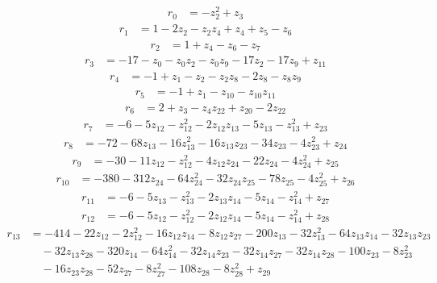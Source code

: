 \begingroup\small
\setlength{\jot}{2pt}
\allowdisplaybreaks[4]
\begin{align*}
r_{0} &=-z_{2}^{2}+z_{3}
\end{align*}
\begin{align*}
r_{1} &=1-2z_{2}-z_{2}z_{4}+z_{4}+z_{5}-z_{6}
\end{align*}
\begin{align*}
r_{2} &=1+z_{4}-z_{6}-z_{7}
\end{align*}
\begin{align*}
r_{3} &=-17-z_{0}-z_{0}z_{2}-z_{0}z_{9}-17z_{2}-17z_{9}+z_{11}
\end{align*}
\begin{align*}
r_{4} &=-1+z_{1}-z_{2}-z_{2}z_{8}-2z_{8}-z_{8}z_{9}
\end{align*}
\begin{align*}
r_{5} &=-1+z_{1}-z_{10}-z_{10}z_{11}
\end{align*}
\begin{align*}
r_{6} &=2+z_{3}-z_{4}z_{22}+z_{20}-2z_{22}
\end{align*}
\begin{align*}
r_{7} &=-6-5z_{12}-z_{12}^{2}-2z_{12}z_{13}-5z_{13}-z_{13}^{2}+z_{23}
\end{align*}
\begin{align*}
r_{8} &=-72-68z_{13}-16z_{13}^{2}-16z_{13}z_{23}-34z_{23}-4z_{23}^{2}+z_{24}
\end{align*}
\begin{align*}
r_{9} &=-30-11z_{12}-z_{12}^{2}-4z_{12}z_{24}-22z_{24}-4z_{24}^{2}+z_{25}
\end{align*}
\begin{align*}
r_{10} &=-380-312z_{24}-64z_{24}^{2}-32z_{24}z_{25}-78z_{25}-4z_{25}^{2}+z_{26}
\end{align*}
\begin{align*}
r_{11} &=-6-5z_{13}-z_{13}^{2}-2z_{13}z_{14}-5z_{14}-z_{14}^{2}+z_{27}
\end{align*}
\begin{align*}
r_{12} &=-6-5z_{12}-z_{12}^{2}-2z_{12}z_{14}-5z_{14}-z_{14}^{2}+z_{28}
\end{align*}
\begin{align*}
r_{13} &=-414-22z_{12}-2z_{12}^{2}-16z_{12}z_{14}-8z_{12}z_{27}-200z_{13}-32z_{13}^{2}-64z_{13}z_{14}-32z_{13}z_{23}\\
&\quad -32z_{13}z_{28}-320z_{14}-64z_{14}^{2}-32z_{14}z_{23}-32z_{14}z_{27}-32z_{14}z_{28}-100z_{23}-8z_{23}^{2}\\
&\quad -16z_{23}z_{28}-52z_{27}-8z_{27}^{2}-108z_{28}-8z_{28}^{2}+z_{29}
\end{align*}
